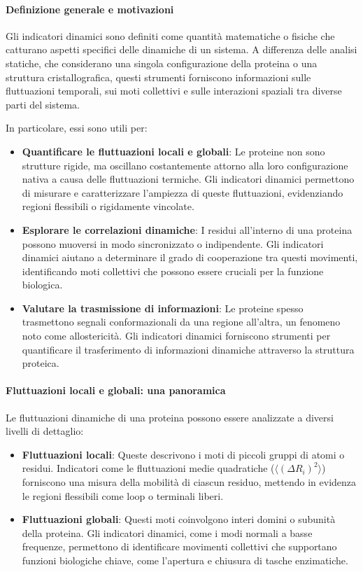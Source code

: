 \documentclass[Lau,binding=0.6cm,oneside,noexaminfo]{sapthesis}
\begin{document}
\paragraph{Definizione generale e motivazioni}
Gli indicatori dinamici sono definiti come quantità matematiche o fisiche che catturano aspetti specifici delle dinamiche di un sistema. A differenza delle analisi statiche, che considerano una singola configurazione della proteina o una struttura cristallografica, questi strumenti forniscono informazioni sulle fluttuazioni temporali, sui moti collettivi e sulle interazioni spaziali tra diverse parti del sistema.

In particolare, essi sono utili per:
\begin{itemize}
    \item \textbf{Quantificare le fluttuazioni locali e globali}: Le proteine non sono strutture rigide, ma oscillano costantemente attorno alla loro configurazione nativa a causa delle fluttuazioni termiche. Gli indicatori dinamici permettono di misurare e caratterizzare l'ampiezza di queste fluttuazioni, evidenziando regioni flessibili o rigidamente vincolate.
    \item \textbf{Esplorare le correlazioni dinamiche}: I residui all'interno di una proteina possono muoversi in modo sincronizzato o indipendente. Gli indicatori dinamici aiutano a determinare il grado di cooperazione tra questi movimenti, identificando moti collettivi che possono essere cruciali per la funzione biologica.
    \item \textbf{Valutare la trasmissione di informazioni}: Le proteine spesso trasmettono segnali conformazionali da una regione all'altra, un fenomeno noto come allostericità. Gli indicatori dinamici forniscono strumenti per quantificare il trasferimento di informazioni dinamiche attraverso la struttura proteica.
\end{itemize}

\paragraph{Fluttuazioni locali e globali: una panoramica}
Le fluttuazioni dinamiche di una proteina possono essere analizzate a diversi livelli di dettaglio:
\begin{itemize}
    \item \textbf{Fluttuazioni locali}: Queste descrivono i moti di piccoli gruppi di atomi o residui. Indicatori come le fluttuazioni medie quadratiche ($\langle (\Delta R_i)^2 \rangle$) forniscono una misura della mobilità di ciascun residuo, mettendo in evidenza le regioni flessibili come loop o terminali liberi.
    \item \textbf{Fluttuazioni globali}: Questi moti coinvolgono interi domini o subunità della proteina. Gli indicatori dinamici, come i modi normali a basse frequenze, permettono di identificare movimenti collettivi che supportano funzioni biologiche chiave, come l'apertura e chiusura di tasche enzimatiche.
\end{itemize}
\end{document}
